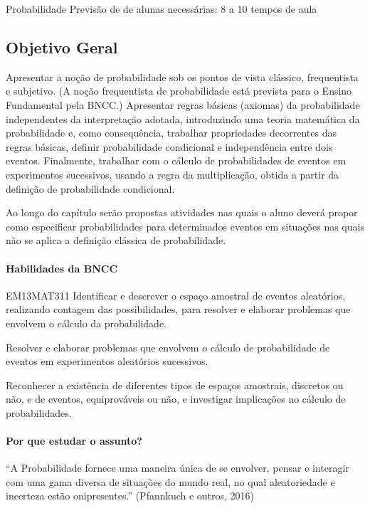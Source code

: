 \mainmatter

\begin{apresentacao}{Probabilidade}
Previsão de de alunas necessárias: 8 a 10 tempos de aula

\subsection{Objetivo Geral}
Apresentar a noção de probabilidade sob os pontos de vista clássico, frequentista e subjetivo. (A noção frequentista de probabilidade está prevista para o Ensino Fundamental pela BNCC.) Apresentar regras básicas (axiomas) da probabilidade independentes da interpretação adotada, introduzindo uma teoria matemática da probabilidade e, como consequência, trabalhar propriedades decorrentes das regras básicas, definir probabilidade condicional e independência entre dois eventos. Finalmente, trabalhar com o cálculo de probabilidades de eventos em experimentos sucessivos, usando a regra da multiplicação, obtida a partir da definição de probabilidade condicional.

Ao longo do capítulo serão propostas atividades nas quais o aluno deverá propor como especificar probabilidades para determinados eventos em situações nas quais não se aplica a definição clássica de probabilidade.

\paragraph{Habilidades da BNCC}
\begin{habilities}{EM13MAT311}
Identificar e descrever o espaço amostral de eventos aleatórios, realizando contagem das possibilidades, para resolver e elaborar problemas que envolvem o cálculo da probabilidade.
\columnbreak

Resolver e elaborar problemas que envolvem o cálculo de probabilidade de eventos em experimentos aleatórios sucessivos.

Reconhecer a existência de diferentes tipos de espaços amostrais, discretos ou não, e de eventos, equiprováveis ou não, e investigar implicações no cálculo de probabilidades.
\end{habilities}

\paragraph{Por que estudar o assunto?}
“A Probabilidade fornece uma maneira única de se envolver, pensar e interagir com uma gama diversa de situações do mundo real, no qual aleatoriedade e incerteza estão onipresentes.”{} (Pfannkuch e outros, 2016)


\end{apresentacao}
